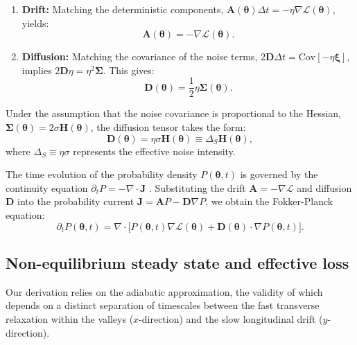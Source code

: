 \documentclass[aps,prx,reprint,superscriptaddress,longbibliography,nofootinbib,floatfix]{revtex4-2}
\begin{document}
\begin{enumerate}
    \item \textbf{Drift:} Matching the deterministic components, $\mathbf{A}(\bm{\theta}) \Delta t = -\eta \nabla \mathcal{L}(\bm{\theta})$, yields:
    \begin{equation}
        \mathbf{A}(\bm{\theta}) = -\nabla \mathcal{L}(\bm{\theta}).
    \end{equation}
    \item \textbf{Diffusion:} Matching the covariance of the noise terms, $2\mathbf{D}\Delta t = \text{Cov}[-\eta \bm{\xi}]$, implies $2\mathbf{D}\eta = \eta^2 \mathbf{\Sigma}$. This gives:
    \begin{equation}
        \mathbf{D}(\bm{\theta}) = \frac{1}{2} \eta \mathbf{\Sigma}(\bm{\theta}).
    \end{equation}
\end{enumerate}

Under the assumption that the noise covariance is proportional to the Hessian, $\mathbf{\Sigma}(\bm{\theta}) = 2\sigma \mathbf{H}(\bm{\theta})$, the diffusion tensor takes the form:
\begin{equation}
    \mathbf{D}(\bm{\theta}) = \eta \sigma \mathbf{H}(\bm{\theta}) \equiv \Delta_S \mathbf{H}(\bm{\theta}),
    \label{eq:si_D_final}
\end{equation}
where $\Delta_S \equiv \eta\sigma$ represents the effective noise intensity.

The time evolution of the probability density $P(\bm{\theta}, t)$ is governed by the continuity equation $\partial_t P = -\nabla \cdot \mathbf{J}$ \cite{gardiner2009stochastic}. Substituting the drift $\mathbf{A} = -\nabla \mathcal{L}$ and diffusion $\mathbf{D}$ into the probability current $\mathbf{J} = \mathbf{A}P - \mathbf{D}\nabla P$, we obtain the Fokker-Planck equation:
\begin{equation}
    \partial_t P(\bm{\theta}, t) = \nabla \cdot \Big[ P(\bm{\theta}, t) \nabla \mathcal{L}(\bm{\theta}) 
    + \mathbf{D}(\bm{\theta}) \cdot \nabla P(\bm{\theta}, t) \Big].
    \label{eq:si_fp_final} 
\end{equation}

\subsection{Non-equilibrium steady state and effective loss} \label{sec:appendix2}

Our derivation relies on the adiabatic approximation, the validity of which depends on a distinct separation of timescales between the fast transverse relaxation within the valleys ($x$-direction) and the slow longitudinal drift ($y$-direction).
\end{document}
